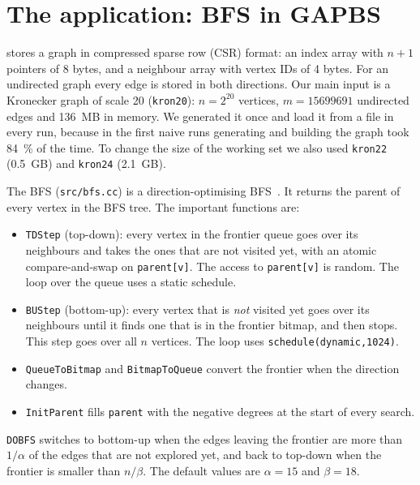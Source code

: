 \section{The application: BFS in GAPBS}
\label{sec:app}

\gapbs{} stores a graph in compressed sparse row (CSR) format: an index array with $n+1$
pointers of 8 bytes, and a neighbour array with vertex IDs of 4 bytes. For an undirected
graph every edge is stored in both directions. Our main input is a Kronecker graph of scale
20 (\texttt{kron20}): $n = 2^{20}$ vertices, $m = \num{15699691}$ undirected edges and
\SI{136}{MB} in memory. We generated it once and load it from a file in every run, because
in the first naive runs generating and building the graph took \SI{84}{\percent} of the
time. To change the size of the working set we also used \texttt{kron22} (\SI{0.5}{GB}) and
\texttt{kron24} (\SI{2.1}{GB}).

The BFS (\texttt{src/bfs.cc}) is a direction-optimising BFS~\cite{beamer2012do}. It returns
the parent of every vertex in the BFS tree. The important functions are:
\begin{itemize}
  \item \texttt{TDStep} (top-down): every vertex in the frontier queue goes over its
        neighbours and takes the ones that are not visited yet, with an atomic
        compare-and-swap on \texttt{parent[v]}. The access to \texttt{parent[v]} is random.
        The loop over the queue uses a static schedule.
  \item \texttt{BUStep} (bottom-up): every vertex that is \emph{not} visited yet goes over its
        neighbours until it finds one that is in the frontier bitmap, and then stops.
        This step goes over all $n$ vertices. The loop uses \texttt{schedule(dynamic,1024)}.
  \item \texttt{QueueToBitmap} and \texttt{BitmapToQueue} convert the frontier when the
        direction changes.
  \item \texttt{InitParent} fills \texttt{parent} with the negative degrees at the start of
        every search.
\end{itemize}
\texttt{DOBFS} switches to bottom-up when the edges leaving the frontier are more than
$1/\alpha$ of the edges that are not explored yet, and back to top-down when the frontier is
smaller than $n/\beta$. The default values are $\alpha = 15$ and $\beta = 18$.

